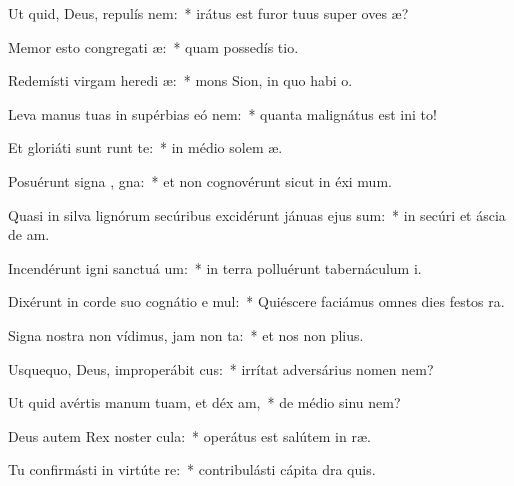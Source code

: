 \item Ut quid, Deus, repulís  nem:~* irátus est furor tuus super oves  æ?
\item Memor esto congregati æ:~* quam possedís  tio.
\item Redemísti virgam heredi æ:~* mons Sion, in quo habi  o.
\item Leva manus tuas in supérbias eó  nem:~* quanta malignátus est ini  to!
\item Et gloriáti sunt  runt te:~* in médio solem æ.
\item Posuérunt signa , gna:~* et non cognovérunt sicut in éxi  mum.
\item Quasi in silva lignórum secúribus excidérunt jánuas ejus  sum:~* in secúri et áscia de am.
\item Incendérunt igni sanctuá um:~* in terra polluérunt tabernáculum  i.
\item Dixérunt in corde suo cognátio e mul:~* Quiéscere faciámus omnes dies festos   ra.
\item Signa nostra non vídimus, jam non  ta:~* et nos non  plius.
\item Usquequo, Deus, improperábit cus:~* irrítat adversárius nomen   nem?
\item Ut quid avértis manum tuam, et déx am,~* de médio sinu   nem?
\item Deus autem Rex noster  cula:~* operátus est salútem in  ræ.
\item Tu confirmásti in virtúte  re:~* contribulásti cápita dra  quis.
